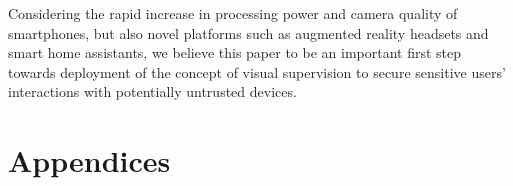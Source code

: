 Considering the rapid increase in processing power and camera quality of smartphones, but also novel platforms such as augmented reality headsets and smart home assistants, we believe this paper to be an important first step towards deployment of the concept of visual supervision to secure sensitive users' interactions with potentially untrusted devices.


\appendix
\section*{Appendices}

%




%
%
%




